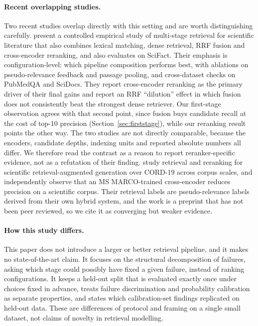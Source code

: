 \documentclass[11pt,a4paper]{article}
\begin{document}
\paragraph{Recent overlapping studies.}
Two recent studies overlap directly with this setting and are worth distinguishing carefully.
\citet{aljoofi2026multistage} present a controlled empirical study of multi-stage retrieval for
scientific literature that also combines lexical matching, dense retrieval, RRF fusion and
cross-encoder reranking, and also evaluates on SciFact. Their emphasis is
configuration-level: which pipeline composition performs best, with ablations on
pseudo-relevance feedback and passage pooling, and cross-dataset checks on PubMedQA and
SciDocs. They report cross-encoder reranking as the primary driver of their final gains and
report an RRF ``dilution'' effect in which fusion does not consistently beat the strongest
dense retriever. Our first-stage observation agrees with that second point, since fusion buys
candidate recall at the cost of top-10 precision (Section~\ref{sec:firststage}), while our
reranking result points the other way. The two studies are not directly comparable, because the
encoders, candidate depths, indexing units and reported absolute numbers all differ. We
therefore read the contrast as a reason to report reranker-specific evidence, not as a
refutation of their finding.
\citet{apurba2026sciret} study retrieval and reranking for scientific
retrieval-augmented generation over CORD-19 across corpus scales, and independently observe
that an MS MARCO-trained cross-encoder reduces precision on a scientific corpus. Their
retrieval labels are pseudo-relevance labels derived from their own hybrid system, and the work
is a preprint that has not been peer reviewed, so we cite it as converging but weaker evidence.

\paragraph{How this study differs.}
This paper does not introduce a larger or better retrieval pipeline, and it makes no
state-of-the-art claim. It focuses on the structural decomposition of failures, asking which
stage could possibly have fixed a given failure, instead of ranking configurations. It keeps a
held-out split that is evaluated exactly once under choices fixed in advance, treats failure
discrimination and probability calibration as separate properties, and states which
calibration-set findings replicated on held-out data. These are differences of protocol and
framing on a single small dataset, not claims of novelty in retrieval modelling.
\end{document}

